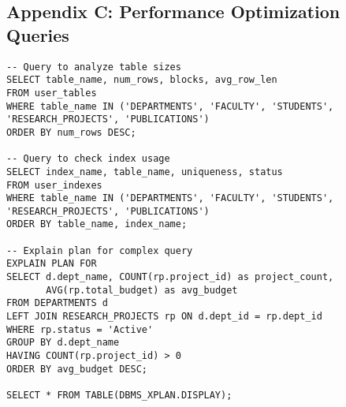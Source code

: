 \documentclass[12pt,a4paper]{article}
\begin{document}
\subsection{Appendix C: Performance Optimization Queries}
\begin{lstlisting}[style=sqlstyle]
-- Query to analyze table sizes
SELECT table_name, num_rows, blocks, avg_row_len
FROM user_tables
WHERE table_name IN ('DEPARTMENTS', 'FACULTY', 'STUDENTS', 'RESEARCH_PROJECTS', 'PUBLICATIONS')
ORDER BY num_rows DESC;

-- Query to check index usage
SELECT index_name, table_name, uniqueness, status
FROM user_indexes
WHERE table_name IN ('DEPARTMENTS', 'FACULTY', 'STUDENTS', 'RESEARCH_PROJECTS', 'PUBLICATIONS')
ORDER BY table_name, index_name;

-- Explain plan for complex query
EXPLAIN PLAN FOR
SELECT d.dept_name, COUNT(rp.project_id) as project_count,
       AVG(rp.total_budget) as avg_budget
FROM DEPARTMENTS d
LEFT JOIN RESEARCH_PROJECTS rp ON d.dept_id = rp.dept_id
WHERE rp.status = 'Active'
GROUP BY d.dept_name
HAVING COUNT(rp.project_id) > 0
ORDER BY avg_budget DESC;

SELECT * FROM TABLE(DBMS_XPLAN.DISPLAY);
\end{lstlisting}
\end{document}
